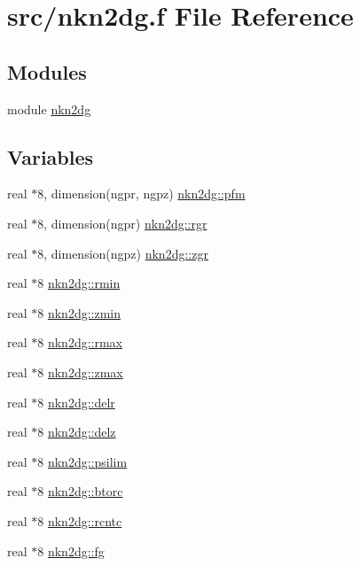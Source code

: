 \hypertarget{nkn2dg_8f}{
\section{src/nkn2dg.f File Reference}
\label{nkn2dg_8f}
}
\subsection*{Modules}
\begin{CompactItemize}
\item 
module \hyperlink{namespacenkn2dg}{nkn2dg}
\end{CompactItemize}
\subsection*{Variables}
\begin{CompactItemize}
\item 
real $\ast$8, dimension(ngpr, ngpz) \hyperlink{namespacenkn2dg_cac07d272bf378866d1d4a0f5dc0db7a}{nkn2dg::pfm}
\item 
real $\ast$8, dimension(ngpr) \hyperlink{namespacenkn2dg_0ec68e915a42a04daca06d6dbbf940c2}{nkn2dg::rgr}
\item 
real $\ast$8, dimension(ngpz) \hyperlink{namespacenkn2dg_0c40a3d27386ecf84f131294ff888421}{nkn2dg::zgr}
\item 
real $\ast$8 \hyperlink{namespacenkn2dg_ff6da305fb08058f838a59caa1a250ee}{nkn2dg::rmin}
\item 
real $\ast$8 \hyperlink{namespacenkn2dg_149c8541a12c707978582512a081c137}{nkn2dg::zmin}
\item 
real $\ast$8 \hyperlink{namespacenkn2dg_b5ad0e96c0a62c643cd273561f582713}{nkn2dg::rmax}
\item 
real $\ast$8 \hyperlink{namespacenkn2dg_94fb3ed033f384d20c9e79216d6c94c4}{nkn2dg::zmax}
\item 
real $\ast$8 \hyperlink{namespacenkn2dg_1aaa2e2804a7843d98344bc63f5bea89}{nkn2dg::delr}
\item 
real $\ast$8 \hyperlink{namespacenkn2dg_3b404dd21c77dcd73a517b55e31d1de1}{nkn2dg::delz}
\item 
real $\ast$8 \hyperlink{namespacenkn2dg_4ab91cc0041ca344c9f72ed4109c6bbd}{nkn2dg::psilim}
\item 
real $\ast$8 \hyperlink{namespacenkn2dg_76a10b481175bae7917e5c0e19c198ee}{nkn2dg::btorc}
\item 
real $\ast$8 \hyperlink{namespacenkn2dg_ab7476f8d5f0b306f5873a3e62b9d84a}{nkn2dg::rcntc}
\item 
real $\ast$8 \hyperlink{namespacenkn2dg_f6426e5fc87f2e775e2e9f5d6efe3ddb}{nkn2dg::fg}
\end{CompactItemize}
